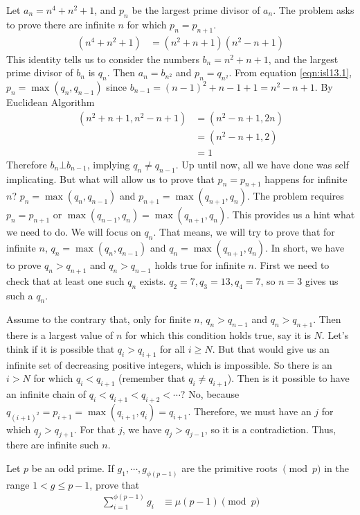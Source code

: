 \begin{solution}
	Let $a_n=n^4+n^2+1$, and $p_n$ be the largest prime divisor of $a_n$. The problem asks to prove there are infinite $n$ for which $p_n=p_{n+1}$.
		\begin{align}
			(n^4+n^2+1) & = (n^2+n+1)(n^2-n+1)\label{eqn:isl13.1}
		\end{align}
	This identity tells us to consider the numbers $b_n=n^2+n+1$, and the largest prime divisor of $b_n$ is $q_n$. Then $a_n=b_{n^2}$ and $p_n=q_{n^2}$. From equation \eqref{eqn:isl13.1}, $p_n=\max(q_n,q_{n-1})$ since $b_{n-1}=(n-1)^2+n-1+1=n^2-n+1$. By Euclidean Algorithm
		\begin{align*}
			(n^2+n+1,n^2-n+1) & = (n^2-n+1,2n)\\
					  & = (n^2-n+1,2)\\
					  & = 1
		\end{align*}
	Therefore $b_n\bot b_{n-1}$, implying $q_n\neq q_{n-1}$. Up until now, all we have done was self implicating. But what will allow us to prove that $p_n=p_{n+1}$ happens for infinite $n$? $p_n=\max(q_n,q_{n-1})$ and $p_{n+1}=\max(q_{n+1},q_n)$. The problem requires $p_n=p_{n+1}$ or $\max(q_{n-1},q_n)=\max(q_{n+1},q_n)$. This provides us a hint what we need to do. We will focus on $q_n$. That means, we will try to prove that for infinite $n$, $q_n=\max(q_n,q_{n-1})$ and $q_n=\max(q_{n+1},q_n)$. In short, we have to prove $q_n>q_{n+1}$ and $q_n>q_{n-1}$ holds true for infinite $n$. First we need to check that at least one such $q_n$ exists. $q_2=7,q_3=13,q_4=7$, so $n=3$ gives us such a $q_n$.

	Assume to the contrary that, only for finite $n$, $q_n>q_{n-1}$ and $q_n>q_{n+1}$. Then there is a largest value of $n$ for which this condition holds true, say it is $N$. Let's think if it is possible that $q_i>q_{i+1}$ for all $i\geq N$. But that would give us an infinite set of decreasing positive integers, which is impossible. So there is an $i>N$ for which $q_i<q_{i+1}$ (remember that $q_i\neq q_{i+1}$). Then is it possible to have an infinite chain of $q_i<q_{i+1}<q_{i+2}<\cdots$? No, because $q_{(i+1)^2}=p_{i+1}=\max(q_{i+1},q_i)=q_{i+1}$. Therefore, we must have an $j$ for which $q_j>q_{j+1}$. For that $j$, we have $q_j>q_{j-1}$, so it is a contradiction. Thus, there are infinite such $n$.
\end{solution}

\begin{problem}
	Let $p$ be an odd prime. If $g_{1}, \cdots, g_{\phi(p-1)}$ are the primitive roots $\pmod{p}$ in the range $1<g \le p-1$, prove that
		\begin{align*}
			\sum_{i=1}^{\phi(p-1)}g_{i}
				& \equiv \mu(p-1) \pmod{p}
		\end{align*}
\end{problem}

